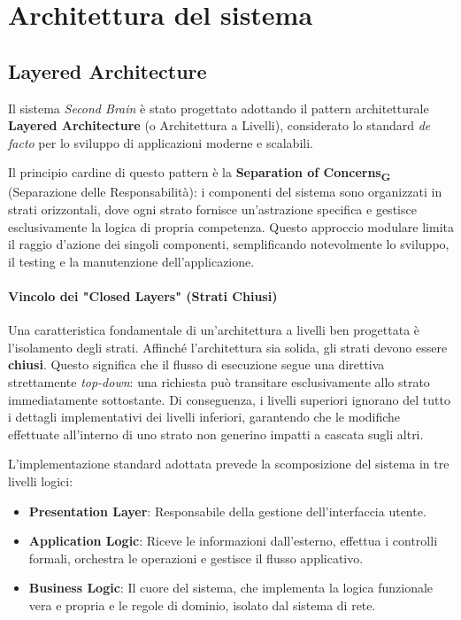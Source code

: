 \documentclass[11pt,a4paper]{article}
\newcommand{\gls}[1]{#1\textsubscript{G}}
\begin{document}
\newpage

\section{Architettura del sistema}
\subsection{Layered Architecture}
Il sistema \textit{Second Brain} è stato progettato adottando il pattern architetturale \textbf{Layered Architecture} (o Architettura a Livelli), considerato lo standard \textit{de facto} per lo sviluppo di applicazioni moderne e scalabili.

Il principio cardine di questo pattern è la \textbf{\gls{Separation of Concerns}} (Separazione delle Responsabilità): i componenti del sistema sono organizzati in strati orizzontali, dove ogni strato fornisce un'astrazione specifica e gestisce esclusivamente la logica di propria competenza. Questo approccio modulare limita il raggio d'azione dei singoli componenti, semplificando notevolmente lo sviluppo, il testing e la manutenzione dell'applicazione.

\paragraph{Vincolo dei "Closed Layers" (Strati Chiusi)}
Una caratteristica fondamentale di un'architettura a livelli ben progettata è l'isolamento degli strati. Affinché l'architettura sia solida, gli strati devono essere \textbf{chiusi}. Questo significa che il flusso di esecuzione segue una direttiva strettamente \textit{top-down}: una richiesta può transitare esclusivamente allo strato immediatamente sottostante. Di conseguenza, i livelli superiori ignorano del tutto i dettagli implementativi dei livelli inferiori, garantendo che le modifiche effettuate all'interno di uno strato non generino impatti a cascata sugli altri.

L'implementazione standard adottata prevede la scomposizione del sistema in tre livelli logici:
\begin{itemize}
    \item \textbf{Presentation Layer}: Responsabile della gestione dell'interfaccia utente.
    \item \textbf{Application Logic}: Riceve le informazioni dall'esterno, effettua i controlli formali, orchestra le operazioni e gestisce il flusso applicativo.
    \item \textbf{Business Logic}: Il cuore del sistema, che implementa la logica funzionale vera e propria e le regole di dominio, isolato dal sistema di rete.
\end{itemize}    
\end{document}
